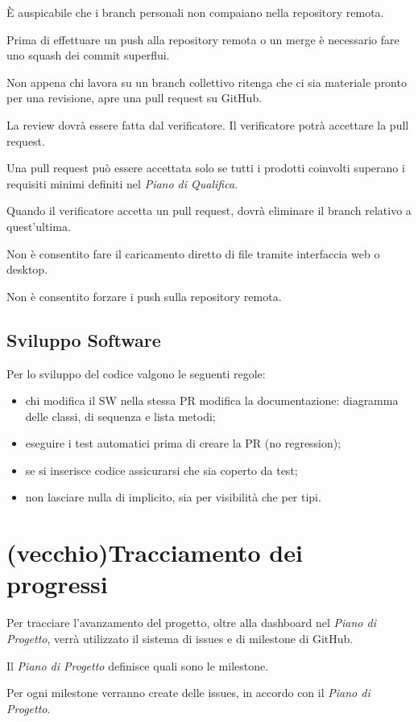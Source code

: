 \documentclass[a4paper, 12pt]{article}
\begin{document}
È auspicabile che i branch personali non compaiano nella repository remota.

Prima di effettuare un push alla repository remota o un merge è necessario fare uno squash dei commit superflui.

Non appena chi lavora su un branch collettivo ritenga che ci sia materiale pronto per una revisione, apre una pull request su GitHub.

La review dovrà essere fatta dal verificatore. Il verificatore potrà accettare la pull request.

Una pull request può essere accettata solo se tutti i prodotti coinvolti superano i requisiti minimi definiti nel \textit{Piano di Qualifica}.

Quando il verificatore accetta un pull request, dovrà eliminare il branch relativo a quest'ultima.

Non è consentito fare il caricamento diretto di file tramite interfaccia web o desktop.

Non è consentito forzare i push sulla repository remota.

\subsection{Sviluppo Software}\label{norme-sw}
Per lo sviluppo del codice valgono le seguenti regole:
\begin{itemize}
	\item chi modifica il SW nella stessa PR modifica la documentazione: diagramma delle classi, di sequenza e lista metodi;
    \item eseguire i test automatici prima di creare la PR (no regression);
    \item se si inserisce codice assicurarsi che sia coperto da test;
    \item non lasciare nulla di implicito, sia per visibilità che per tipi.
\end{itemize}

\section{(vecchio)Tracciamento dei progressi}
Per tracciare l'avanzamento del progetto, oltre alla dashboard nel \textit{Piano di Progetto}, verrà utilizzato il sistema di issues e di milestone di GitHub.

Il \textit{Piano di Progetto} definisce quali sono le milestone.

Per ogni milestone verranno create delle issues, in accordo con il \textit{Piano di Progetto}.
\end{document}
